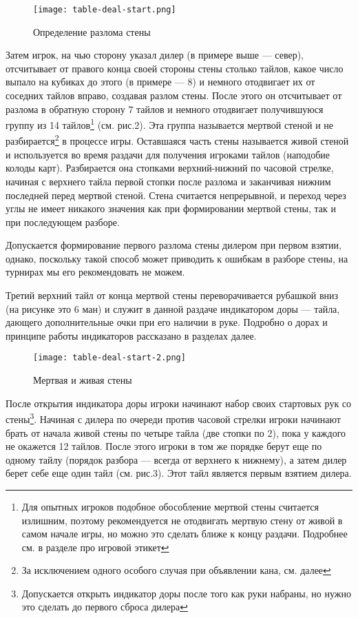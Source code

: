\begin{figure}[H]
	\centering
	\texttt{[image: table-deal-start.png]}
	\caption{Определение разлома стены}
\end{figure}

Затем игрок, на чью сторону указал дилер (в примере выше --- север), отсчитывает от правого конца своей стороны стены столько тайлов, какое число выпало на кубиках до этого (в примере --- 8) и немного отодвигает их от соседних тайлов вправо, создавая разлом стены. После этого он отсчитывает от разлома в обратную сторону 7 тайлов и немного отодвигает получившуюся группу из 14 тайлов\footnote{Для опытных игроков подобное обособление мертвой стены считается излишним, поэтому рекомендуется не отодвигать мертвую стену от живой в самом начале игры, но можно это сделать ближе к концу раздачи. Подробнее см. в разделе про игровой этикет} (см. рис.2). Эта группа называется мертвой стеной и не разбирается\footnote{За исключением одного особого случая при объявлении кана, см. далее} в процессе игры. Оставшаяся часть стены называется живой стеной и используется во время раздачи для получения игроками тайлов (наподобие колоды карт). Разбирается она стопками верхний-нижний по часовой стрелке, начиная с верхнего тайла первой стопки после разлома и заканчивая нижним последней перед мертвой стеной. Стена считается непрерывной, и переход через углы не имеет никакого значения как при формировании мертвой стены, так и при последующем разборе.

Допускается формирование первого разлома стены дилером при первом взятии, однако, поскольку такой способ может приводить к ошибкам в разборе стены, на турнирах мы его рекомендовать не можем.

Третий верхний тайл от конца мертвой стены переворачивается рубашкой вниз (на рисунке это 6 ман) и служит в данной раздаче индикатором доры --- тайла, дающего дополнительные очки при его наличии в руке. Подробно о дорах и принципе работы индикаторов рассказано в разделах далее.

\begin{figure}[H]
	\centering
	\texttt{[image: table-deal-start-2.png]}
	\caption{Мертвая и живая стены}
\end{figure}

После открытия индикатора доры игроки начинают набор своих стартовых рук со стены\footnote{Допускается открыть индикатор доры после того как руки набраны, но нужно это сделать до первого сброса дилера}. Начиная с дилера по очереди против часовой стрелки игроки начинают брать от начала живой стены по четыре тайла (две стопки по 2), пока у каждого не окажется 12 тайлов. После этого игроки в том же порядке берут еще по одному тайлу (порядок разбора --- всегда от верхнего к нижнему), а затем дилер берет себе еще один тайл (см. рис.3). Этот тайл является первым взятием дилера.


